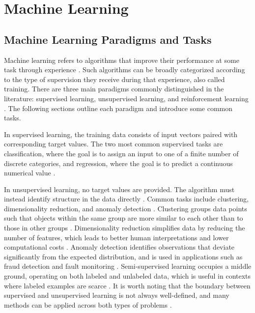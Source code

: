 \section{Machine Learning}

\subsection{Machine Learning Paradigms and Tasks}

Machine learning refers to algorithms that improve their performance 
at some task through experience 
\parencite{mitchell1997machine_learning}. 
Such algorithms can be broadly categorized according to the type of 
supervision they receive during that experience, also called training. 
There are three main paradigms commonly distinguished in the literature: 
supervised learning, unsupervised learning, and reinforcement learning 
\parencite{bishop2006pattern_recognition_machine_learning}
\parencite[Chapter~5]{Goodfellow-et-al-2016}
\parencite{sarker2021machine_learning_algorithms_real_world_applications_research_directions}.
The following sections outline each paradigm and introduce some common 
tasks.

In supervised learning, the training data consists of input vectors paired 
with corresponding target values. The two most common supervised tasks are 
classification, where the goal is to assign an input to one of a finite number 
of discrete categories, and regression, where the goal is to predict a continuous 
numerical value 
\parencite{bishop2006pattern_recognition_machine_learning}
\parencite[Chapter~5]{Goodfellow-et-al-2016}.

In unsupervised learning, no target values are provided. The algorithm must 
instead identify structure in the data directly 
\parencite{bishop2006pattern_recognition_machine_learning}. 
Common tasks include clustering, dimensionality reduction, and anomaly detection 
\parencite{sarker2021machine_learning_algorithms_real_world_applications_research_directions}
\parencite[Chapter~5]{Goodfellow-et-al-2016}.
Clustering groups data points such that objects within the same group are more 
similar to each other than to those in other groups 
\parencite{sarker2021machine_learning_algorithms_real_world_applications_research_directions}. 
Dimensionality reduction simplifies data by reducing the number of features, 
which leads to better human interpretations and lower computational costs
\parencite{sarker2021machine_learning_algorithms_real_world_applications_research_directions}. 
Anomaly detection identifies observations that deviate significantly from the 
expected distribution, and is used in applications such as fraud detection and 
fault monitoring 
\parencite[Chapter~5]{Goodfellow-et-al-2016}.
Semi-supervised learning occupies a middle ground, operating on both labeled 
and unlabeled data, which is useful in contexts where labeled examples are scarce 
\parencite{sarker2021machine_learning_algorithms_real_world_applications_research_directions}. 
It is worth noting that the boundary between supervised and unsupervised learning 
is not always well-defined, and many methods can be applied across both types 
of problems \parencite[Chapter~5]{Goodfellow-et-al-2016}.

